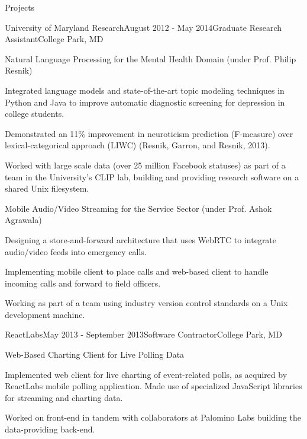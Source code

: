 \documentclass{resume} %
\begin{document}
\newpage

\begin{rSection}{Projects}

\begin{rSubsection}{University of Maryland Research}{August 2012 - May 2014}{Graduate Research Assistant}{College Park, MD}
\item
\begin{rWorkProject}{Natural Language Processing for the Mental Health Domain (under Prof. Philip Resnik)}
\item Integrated language models and state-of-the-art topic modeling techniques in Python and Java to improve automatic diagnostic screening for depression in college students.
\item Demonstrated an 11\% improvement in neuroticism prediction (F-measure) over lexical-categorical approach (LIWC) (Resnik, Garron, and Resnik, 2013).
\item Worked with large scale data (over 25 million Facebook statuses) as part of a team in the University's CLIP lab, building and providing research software on a shared Unix filesystem.
\end{rWorkProject}
\item
\begin{rWorkProject}{Mobile Audio/Video Streaming for the Service Sector (under Prof. Ashok Agrawala)}
\item Designing a store-and-forward architecture that uses WebRTC to integrate audio/video feeds into emergency calls.
\item Implementing mobile client to place calls and web-based client to handle incoming calls and forward to field officers.
\item Working as part of a team using industry version control standards on a Unix development machine.
\end{rWorkProject}
\end{rSubsection}

\begin{rSubsection}{ReactLabs}{May 2013 - September 2013}{Software Contractor}{College Park, MD}
\item
\begin{rWorkProject}{Web-Based Charting Client for Live Polling Data}
\item Implemented web client for live charting of event-related polls, as acquired by ReactLabs mobile polling application. Made use of specialized JavaScript libraries for streaming and charting data.
\item Worked on front-end in tandem with collaborators at Palomino Labs building the data-providing back-end.
\end{rWorkProject}
\end{rSubsection}



\end{rSection}
\end{document}
